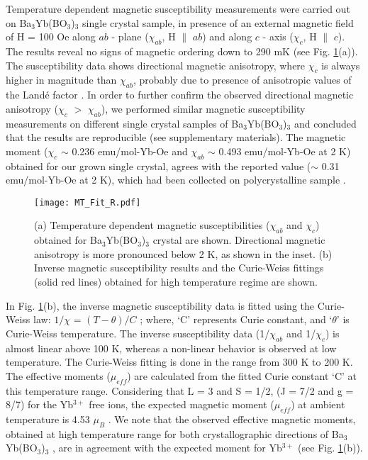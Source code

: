 \documentclass[aps,prl,reprint,showpacs,showkeys,superscriptaddress,floatfix,twocolumn]{revtex4-2}
\newcommand{\bybo}{Ba$_3$Yb(BO$_3$)$_3$}
\begin{document}
Temperature dependent magnetic susceptibility measurements were carried out on \bybo{} single crystal sample, in presence of an external magnetic field of H = 100 Oe along $ab$ - plane ($\chi_{ab}$, H $\parallel$ $ab$) and along $c$ - axis ($\chi_{c}$, H $\parallel$ $c$).  The results reveal no signs of magnetic ordering down to 290 mK (see Fig. \ref{MT}(a)). The susceptibility data shows directional magnetic anisotropy, where  $\chi_{c}$ is always higher in magnitude than $\chi_{ab}$, probably due to presence of anisotropic values of the Land\'e factor \cite{LiPRL2015,LiPRL2017,MaPRL2018}. In order to further confirm the observed directional magnetic anisotropy ($\chi_{c}$ $>$  $\chi_{ab}$), we performed similar magnetic susceptibility measurements on different single crystal samples of \bybo{} and concluded that the results are reproducible (see supplementary materials). The magnetic moment ($\chi_{c}$ $\sim$ 0.236 emu/mol-Yb-Oe and $\chi_{ab}$ $\sim$ 0.493 emu/mol-Yb-Oe at 2 K) obtained for our grown single crystal, agrees with the reported value  ($\sim$ 0.31 emu/mol-Yb-Oe at 2 K), which had been collected on polycrystalline sample \cite{GaoJAC2018}. 

\begin{figure}[htbp]\centering\texttt{[image: MT\_Fit\_R.pdf]}
	\caption{(a) Temperature dependent magnetic susceptibilities ($\chi_{ab}$ and $\chi_c$) obtained for \bybo{} crystal are shown. Directional magnetic anisotropy is more pronounced below 2 K, as shown in the inset. (b) Inverse magnetic susceptibility results and the Curie-Weiss fittings (solid red lines) obtained for high temperature regime are shown.}
	\label{MT}
\end{figure}

In Fig. \ref{MT}(b), the inverse magnetic susceptibility data is fitted using the Curie-Weiss law: $1/\chi$ = $(T - \theta)/C$ ; where, `C' represents Curie constant, and `$\theta$' is Curie-Weiss temperature. The inverse susceptibility data (1/$\chi_{ab}$ and 1/$\chi_c$) is almost linear above 100 K, whereas a non-linear behavior is observed at low temperature. The Curie-Weiss fitting is done in the range from 300 K to 200 K. The effective moments ($\mu_{eff}$) are calculated from the fitted Curie constant `C'  at this temperature range. Considering that L = 3 and S = 1/2, (J = 7/2 and g = 8/7) for the Yb$^{3+}$ free ions, the expected magnetic moment ($\mu_{eff}$) at ambient temperature is 4.53 $\mu_{B}$ \cite{Blundell2001}. We note that the observed effective magnetic moments, obtained at high temperature range for both crystallographic directions of \bybo{} , are in agreement with the expected moment for Yb$^{3+}$ (see Fig. \ref{MT}(b)).   
\end{document}
